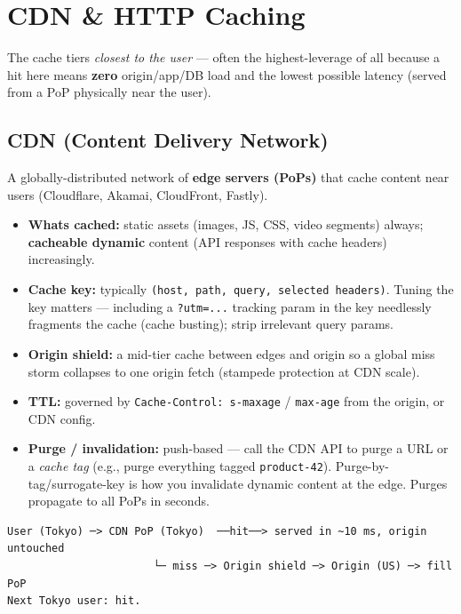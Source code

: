 \documentclass[11pt]{article}
\providecommand{\tightlist}{\setlength{\itemsep}{1pt}\setlength{\parskip}{0pt}}
\begin{document}
\section{CDN \& HTTP Caching}\label{cdn--http-caching}

The cache tiers \emph{closest to the user} --- often the highest-leverage of all because a hit here means \textbf{zero} origin/app/DB load and the lowest possible latency (served from a PoP physically near the user).

\subsection{CDN (Content Delivery Network)}\label{cdn-content-delivery-network}

A globally-distributed network of \textbf{edge servers (PoPs)} that cache content near users (Cloudflare, Akamai, CloudFront, Fastly).

\begin{itemize}
\tightlist
\item
  \textbf{What\textquotesingle s cached:} static assets (images, JS, CSS, video segments) always; \textbf{cacheable dynamic} content (API responses with cache headers) increasingly.
\item
  \textbf{Cache key:} typically \texttt{(host,\ path,\ query,\ selected\ headers)}. Tuning the key matters --- including a \texttt{?utm=...} tracking param in the key needlessly fragments the cache (cache busting); strip irrelevant query params.
\item
  \textbf{Origin shield:} a mid-tier cache between edges and origin so a global miss storm collapses to one origin fetch (stampede protection at CDN scale).
\item
  \textbf{TTL:} governed by \texttt{Cache-Control:\ s-maxage} / \texttt{max-age} from the origin, or CDN config.
\item
  \textbf{Purge / invalidation:} push-based --- call the CDN API to purge a URL or a \emph{cache tag} (e.g., purge everything tagged \texttt{product-42}). Purge-by-tag/surrogate-key is how you invalidate dynamic content at the edge. Purges propagate to all PoPs in seconds.
\end{itemize}

\setcodelang{}

\begin{verbatim}
User (Tokyo) ─> CDN PoP (Tokyo)  ──hit──> served in ~10 ms, origin untouched
                       └─ miss ─> Origin shield ─> Origin (US) ─> fill PoP
Next Tokyo user: hit.
\end{verbatim}
\end{document}

